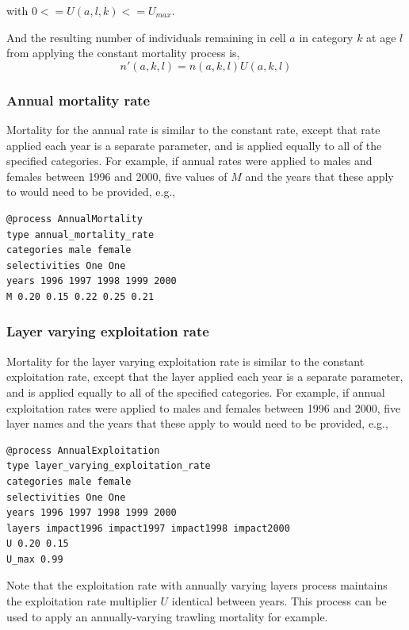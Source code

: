 with $0<=U(a,l,k)<=U_{max}$.

And the resulting number of individuals remaining in cell $a$ in category $k$ at age $l$ from applying the constant mortality process is,
\begin{equation}
  n'(a,k,l) = n(a,k,l) U(a,k,l)
\end{equation}

\subsubsection*{Annual mortality rate}

Mortality for the annual rate is similar to the constant rate, except that rate applied each year is a separate parameter, and is applied equally to all of the specified categories. For example, if annual rates were applied to males and females between 1996 and 2000, five values of $M$ and the years that these apply to would need to be provided, e.g., 
{\small{\begin{verbatim}
@process AnnualMortality
type annual_mortality_rate
categories male female
selectivities One One
years 1996 1997 1998 1999 2000
M 0.20 0.15 0.22 0.25 0.21
\end{verbatim}}}

\subsubsection*{Layer varying exploitation rate}

Mortality for the layer varying exploitation rate is similar to the constant exploitation rate, except that the layer applied each year is a separate parameter, and is applied equally to all of the specified categories. For example, if annual exploitation rates were applied to males and females between 1996 and 2000, five layer names and the years that these apply to would need to be provided, e.g., 
{\small{\begin{verbatim}
@process AnnualExploitation
type layer_varying_exploitation_rate
categories male female
selectivities One One
years 1996 1997 1998 1999 2000
layers impact1996 impact1997 impact1998 impact2000
U 0.20 0.15
U_max 0.99
\end{verbatim}}}

Note that the exploitation rate with annually varying layers process maintains the exploitation rate multiplier $U$ identical between years. This process can be used to apply an annually-varying trawling mortality for example.

